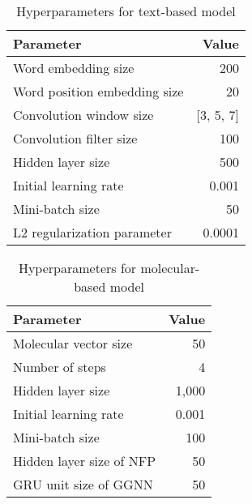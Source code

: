 \documentclass[11pt,a4paper]{article}
\begin{document}
\begin{table}[ht]
  \centering
  \begin{tabular}{lr}\hline
  Parameter & Value \\\hline
  Word embedding size & 200 \\
  Word position embedding size & 20 \\ 
  Convolution window size & [3, 5, 7] \\
  Convolution filter size & 100 \\
  Hidden layer size & 500 \\
  Initial learning rate & 0.001 \\
  Mini-batch size & 50 \\
  L2 regularization parameter & 0.0001 \\
  
  \hline
  \end{tabular}
  \caption{Hyperparameters for text-based model}
  \label{table:param}
\end{table}

\begin{table}[ht]
  \centering
  \begin{tabular}{lr} \hline
  Parameter & Value \\\hline
  Molecular vector size & 50 \\
  Number of steps & 4 \\
  Hidden layer size & 1,000 \\
  Initial learning rate & 0.001 \\
  Mini-batch size & 100 \\
  Hidden layer size of NFP & 50 \\
  GRU unit size of GGNN & 50 \\\hline
  \end{tabular}
  \caption{Hyperparameters for molecular-based model}
  \label{table:gcn_hyperparams}
\end{table}
\end{document}
